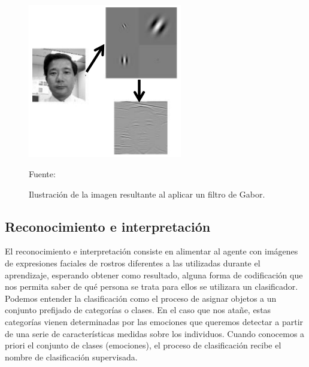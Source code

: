 \begin{enumerate}
\begin{figure}[ht]
\begin{center}
\includegraphics[width=0.6\textwidth]{Imagen24}
\end{center}
\begin{center}
\vskip -0.5cm
\caption{\small{Ilustración de la imagen resultante al aplicar un filtro de Gabor.}}
{\small{Fuente: \cite{Aguilar}}}
\end{center}
\end{figure}

\end{enumerate}

\subsection{Reconocimiento e interpretación}

El reconocimiento e interpretación consiste en alimentar al agente con imágenes de expresiones faciales de rostros diferentes a las utilizadas durante el aprendizaje, esperando obtener como resultado, alguna forma de codificación que nos permita saber de qué persona se trata para ellos se utilizara un clasificador.
\vskip 0.1cm
Podemos entender la clasificación como el proceso de asignar objetos a un conjunto prefijado de categorías o clases. En el caso que nos atañe, estas categorías vienen determinadas por las emociones que queremos detectar a partir de una serie de características medidas sobre los individuos. Cuando conocemos a priori el conjunto de clases (emociones), el proceso de clasificación recibe el nombre de clasificación supervisada.

